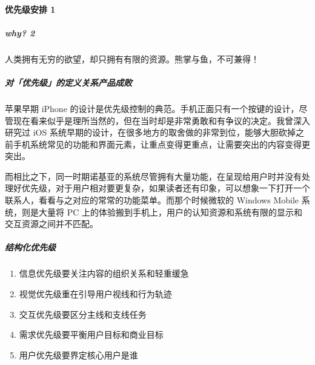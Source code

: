\documentclass[letterpaper,10pt,english]{sphinxmanual}
\begin{document}
\paragraph{优先级安排 1\sphinxfootnotemark[543]}
\label{\detokenize{chapter_knowledge/demand_analysis:id7}}%
\begin{footnotetext}[543]\sphinxAtStartFootnote
{}
%
\end{footnotetext}\ignorespaces 

\subparagraph{why? 2\sphinxfootnotemark[544]}
\label{\detokenize{chapter_knowledge/demand_analysis:why-2}}%
\begin{footnotetext}[544]\sphinxAtStartFootnote
{}
%
\end{footnotetext}\ignorespaces 
人类拥有无穷的欲望，却只拥有有限的资源。熊掌与鱼，不可兼得！


\subparagraph{对「优先级」的定义关系产品成败}
\label{\detokenize{chapter_knowledge/demand_analysis:id8}}
苹果早期 iPhone
的设计是优先级控制的典范。手机正面只有一个按键的设计，尽管现在看来似乎是理所当然的，但在当时却是非常勇敢和有争议的决定。我曾深入研究过
iOS
系统早期的设计，在很多地方的取舍做的非常到位，能够大胆砍掉之前手机系统常见的功能和界面元素，让重点变得更重点，让需要突出的内容变得更突出。

而相比之下，同一时期诺基亚的系统尽管拥有大量功能，在呈现给用户时并没有处理好优先级，对于用户相对要更复杂，如果读者还有印象，可以想象一下打开一个联系人，看看与之对应的常常的功能菜单。而那个时候微软的
Windows Mobile 系统，则是大量将 PC
上的体验搬到手机上，用户的认知资源和系统有限的显示和交互资源之间并不匹配。


\subparagraph{结构化优先级}
\label{\detokenize{chapter_knowledge/demand_analysis:id9}}\begin{enumerate}
%
\item {} 
信息优先级要关注内容的组织关系和轻重缓急

\item {} 
视觉优先级重在引导用户视线和行为轨迹

\item {} 
交互优先级要区分主线和支线任务

\item {} 
需求优先级要平衡用户目标和商业目标

\item {} 
用户优先级要界定核心用户是谁

\end{enumerate}
\end{document}
